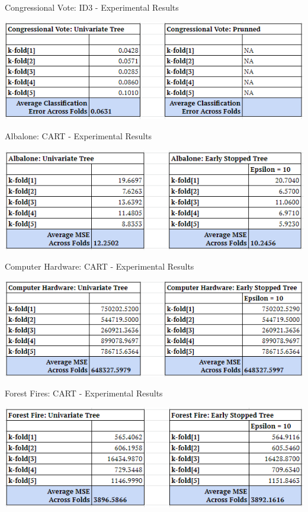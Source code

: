 \documentclass[twoside,11pt]{article}
\begin{document}
\begin{table}[h]
		\centering
		\caption{Congressional Vote: ID3 - Experimental Results}
		\label{tab:table3}
		\includegraphics[scale=.7]{CongVote_Results}\newline
\end{table}

\begin{table}[h]
	\centering
	\caption{Albalone: CART - Experimental Results}
	\label{tab:table4}
	\includegraphics[scale=.7]{Albalone_Results}\newline
\end{table}

\begin{table}[h]
	\centering
	\caption{Computer Hardware: CART - Experimental Results}
	\label{tab:tale5}
	\includegraphics[scale=.7]{CompHardware_Results}\newline
\end{table}

\begin{table}[h]
	\centering
	\caption{Forest Fires: CART - Experimental Results}
	\label{tab:table6}
	\includegraphics[scale=.7]{ForestFire_Results}\newline
\end{table}
\end{document}
